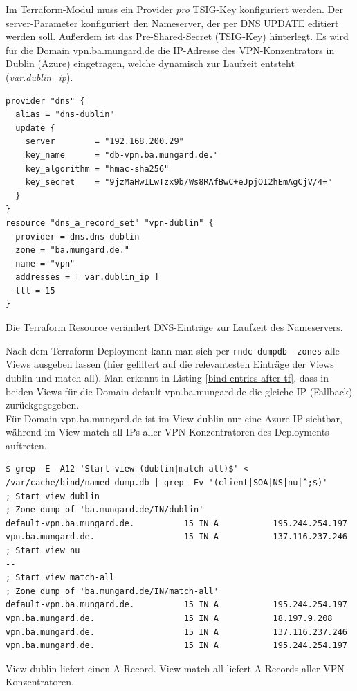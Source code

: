 Im Terraform-Modul muss ein Provider \textit{pro} TSIG-Key konfiguriert werden. Der server-Parameter konfiguriert den Nameserver, der per DNS UPDATE editiert werden soll. Außerdem ist das Pre-Shared-Secret (TSIG-Key) hinterlegt. Es wird für die Domain vpn.ba.mungard.de die IP-Adresse des VPN-Konzentrators in Dublin (Azure) eingetragen, welche dynamisch zur Laufzeit entsteht (\textit{var.dublin\_ip}).
\begin{listing}[h]
\begin{verbatim}
provider "dns" {
  alias = "dns-dublin"
  update {
    server        = "192.168.200.29"
    key_name      = "db-vpn.ba.mungard.de."
    key_algorithm = "hmac-sha256"
    key_secret    = "9jzMaHwILwTzx9b/Ws8RAfBwC+eJpjOI2hEmAgCjV/4="
  }
}
resource "dns_a_record_set" "vpn-dublin" {
  provider = dns.dns-dublin
  zone = "ba.mungard.de."
  name = "vpn"
  addresses = [ var.dublin_ip ]
  ttl = 15
}
\end{verbatim}
\caption{Die Terraform Resource verändert DNS-Einträge zur Laufzeit des Nameservers.}
\label{tf-provider-dns}
\end{listing}\FloatBarrier
Nach dem Terraform-\gls{Deployment} kann man sich per \texttt{rndc dumpdb -zones} alle Views ausgeben lassen (hier gefiltert auf die relevantesten Einträge der Views \glqq dublin\grqq{} und \glqq match-all\grqq{}). Man erkennt in Listing \ref{bind-entries-after-tf}, dass in beiden Views für die Domain default-vpn.ba.mungard.de die gleiche IP (\glqq Fallback\grqq{}) zurückgegegeben.\\
Für Domain vpn.ba.mungard.de ist im View \glqq dublin\grqq{} nur eine Azure-IP sichtbar, während im View \glqq match-all\grqq{} IPs aller VPN-Konzentratoren des \gls{Deployment}s auftreten.
\begin{listing}[h]
\begin{verbatim}
$ grep -E -A12 'Start view (dublin|match-all)$' < /var/cache/bind/named_dump.db | grep -Ev '(client|SOA|NS|nu|^;$)'
; Start view dublin
; Zone dump of 'ba.mungard.de/IN/dublin'
default-vpn.ba.mungard.de.          15 IN A           195.244.254.197
vpn.ba.mungard.de.                  15 IN A           137.116.237.246
; Start view nu
--
; Start view match-all
; Zone dump of 'ba.mungard.de/IN/match-all'
default-vpn.ba.mungard.de.          15 IN A           195.244.254.197
vpn.ba.mungard.de.                  15 IN A           18.197.9.208
vpn.ba.mungard.de.                  15 IN A           137.116.237.246
vpn.ba.mungard.de.                  15 IN A           195.244.254.197

\end{verbatim}
\caption{View \glqq dublin\grqq{} liefert einen A-Record. View \glqq match-all\grqq{} liefert A-Records aller VPN-Konzentratoren.}
\label{bind-entries-after-tf}
\end{listing}\FloatBarrier

